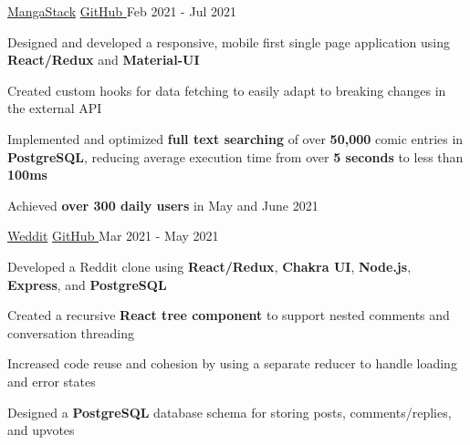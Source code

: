 
\begin{cventries}
  \cventry
    {\fontsize{10pt}{1em}\bodyfont\upshape{}} %
    {\href{https://mangastack.cf/}{MangaStack}} %
    {\href{https://github.com/tacticaltofu/mangastack}{GitHub \faExternalLink}} %
    {Feb 2021 - Jul 2021} %
    {
      \begin{cvitems} %
        \item {Designed and developed a responsive, mobile first single page application using \textbf{React/Redux} and \textbf{Material-UI}}
        \item {Created custom hooks for data fetching to easily adapt to breaking changes in the external API}
        \item {Implemented and optimized \textbf{full text searching} of over \textbf{50,000} comic entries in \textbf{PostgreSQL}, reducing average execution time from over \textbf{5 seconds} to less than \textbf{100ms}}
        \item {Achieved \textbf{over 300 daily users} in May and June 2021}
      \end{cvitems}
    }
    
  \cventry
    {\fontsize{10pt}{1em}\bodyfont\upshape{}} %
    {\href{https://weddit.netlify.app/}{Weddit}} %
    {\href{https://github.com/tacticaltofu/reddit-clone}{GitHub \faExternalLink}} %
    {Mar 2021 - May 2021} %
    {
      \begin{cvitems} %
        \item {Developed a Reddit clone using \textbf{React/Redux}, \textbf{Chakra UI}, \textbf{Node.js}, \textbf{Express}, and \textbf{PostgreSQL}}
        \item {Created a recursive \textbf{React tree component} to support nested comments and conversation threading}
        \item {Increased code reuse and cohesion by using a separate reducer to handle loading and error states}
        \item {Designed a \textbf{PostgreSQL} database schema for storing posts, comments/replies, and upvotes}
      \end{cvitems}
    }
\end{cventries}